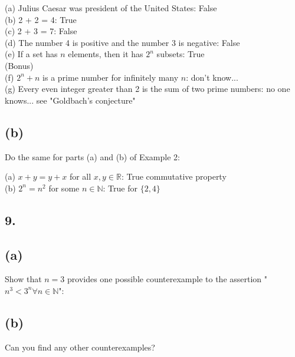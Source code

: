 \documentclass[11pt]{article}
\begin{document}
\begin{flushleft}
(a) Julius Caesar was president of the United States: False\\
(b) 2 + 2 = 4: True\\
(c) 2 + 3 = 7: False\\
(d) The number 4 is positive and the number 3 is negative: False\\
(e) If a set has $n$ elements, then it has $2^{n}$ subsets: True\\
(Bonus)\\
(f) $2^{n} + n $ is a prime number for infinitely many $n$: don't know...\\
(g) Every even integer greater than 2 is the sum of two prime numbers: no one knows... see "Goldbach's conjecture"\\
\end{flushleft}

\subsection*{(b)}
\begin{center}
Do the same for parts (a) and (b) of Example 2:
\end{center}

\begin{flushleft}
(a) $x + y = y + x$ for all $x,y \in \mathbb{R}$: True commutative property\\
(b) $2^{n} = n^{2}$ for some $n \in \mathbb{N}$: True for $\{2,4\}$\\
\end{flushleft}
%
%
\subsection*{9.}

\subsection*{(a)}
\begin{center}
Show that $n = 3$ provides one possible counterexample to the assertion "$n^{3} < 3^{n} \forall n \in \mathbb{N}$":\\

\end{center}

\subsection*{(b)}
\begin{center}
Can you find any other counterexamples?\\

\end{center}
\end{document}
